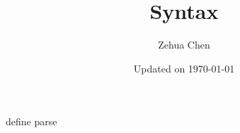 \documentclass{report}
\title{Syntax}
\author{Zehua Chen}
\date{Updated on \today}
\begin{document}
  \maketitle
  \tableofcontents

  {define}
  {parse}
\end{document}
